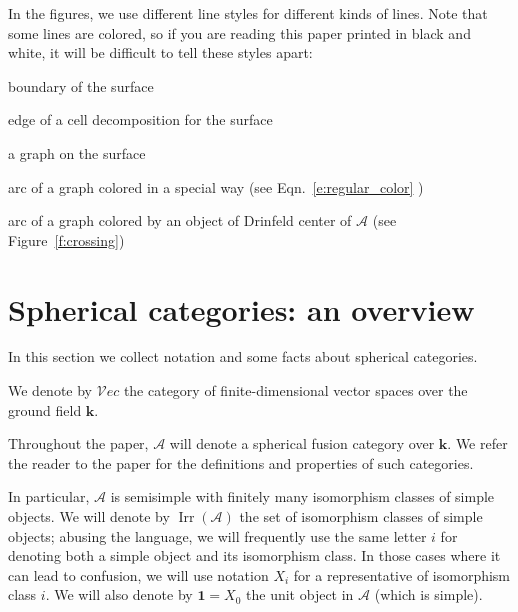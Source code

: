 \documentclass{amsart}
\theoremstyle{definition}
\theoremstyle{remark}
\numberwithin{equation}{section}
\newcommand{\firef}[1]{Figure~{\rm\ref{#1}}}
\newcommand{\<}{\langle}
\renewcommand{\>}{\rangle}
\newcommand{\one}{\mathbf{1}}
\newcommand{\kk}{\mathbf{k}}       %
\newcommand{\A}{\mathcal{A}}      %
\newcommand{\Vect}{\mathcal{V}ec}  %
\DeclareMathOperator{\Irr}{Irr}
\begin{document}
In the figures, we use different line styles for different kinds of lines. Note that some lines are colored, so if you are reading this paper printed in black and white, it will be difficult to tell these styles apart:

  
  \qquad boundary of the surface
  
  \qquad edge of a cell decomposition for the surface
  
 
  \qquad a graph on the surface

  \qquad arc of a graph colored in a special way 
   (see Eqn.~\eqref{e:regular_color} )
  
  
  \qquad arc of a graph colored by an object of Drinfeld center of $\A$ 
  (see   \firef{f:crossing})
  
  

\section{Spherical categories: an overview}\label{s:LW1}

In this section we collect notation and some facts about spherical
categories.

We denote by $\Vect$ the category of finite-dimensional vector spaces over
the ground field $\kk$.

Throughout the paper, $\A$ will denote a spherical fusion category over 
 $\kk$. We refer the reader to the paper  for the
definitions and properties of such categories.

In particular, $\A$ is semisimple with finitely many
isomorphism classes of simple objects. We will denote by $\Irr(\A)$ the
set of isomorphism classes of simple objects; abusing the language, we will
frequently use the same letter $i$ for denoting both a  simple object and 
its isomorphism class. In those cases where it can lead to confusion, we
will use notation $X_i$ for a representative of isomorphism class $i$. We
will also denote by $\one=X_0$ the unit object in $\A$ (which is simple). 
\end{document}
